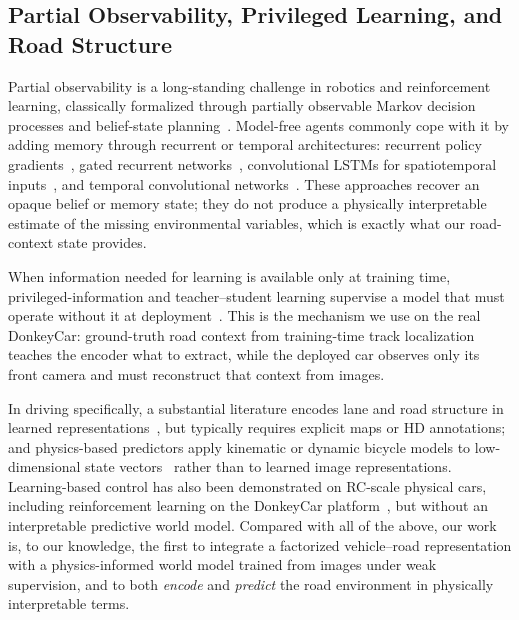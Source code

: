 \documentclass[preprint,12pt]{elsarticle}
\begin{document}
\subsection{Partial Observability, Privileged Learning, and Road Structure}\label{sec:rw_po}

Partial observability is a long-standing challenge in robotics and reinforcement
learning, classically formalized through partially observable Markov decision
processes and belief-state planning~\cite{kaelbling1998planning,
kaelbling1996reinforcement}.
Model-free agents commonly cope with it by adding memory through recurrent or
temporal architectures: recurrent policy gradients~\cite{wierstra2007solving},
gated recurrent networks~\cite{chung2014empirical}, convolutional LSTMs for
spatiotemporal inputs~\cite{shi2015convolutional}, and temporal convolutional
networks~\cite{bai2018empirical}.
These approaches recover an opaque belief or memory state; they do not produce a
physically interpretable estimate of the missing environmental variables, which is
exactly what our road-context state provides.

When information needed for learning is available only at training time,
privileged-information and teacher--student learning supervise a model that must
operate without it at deployment~\cite{chen2020learning, gou2021knowledge}.
This is the mechanism we use on the real DonkeyCar: ground-truth road context from
training-time track localization teaches the encoder what to extract, while the
deployed car observes only its front camera and must reconstruct that context from
images.

In driving specifically, a substantial literature encodes lane and road structure
in learned representations~\cite{salzmann2020trajectron++, itkina2023interpretable},
but typically requires explicit maps or HD annotations; and physics-based
predictors apply kinematic or dynamic bicycle models to low-dimensional state
vectors~\cite{kong2015kinematic} rather than to learned image representations.
Learning-based control has also been demonstrated on RC-scale physical cars,
including reinforcement learning on the DonkeyCar
platform~\cite{viitala2021learning}, but without an
interpretable predictive world model.
Compared with all of the above, our work is, to our knowledge, the first to
integrate a factorized vehicle--road representation with a physics-informed world
model trained from images under weak supervision, and to both \emph{encode} and
\emph{predict} the road environment in physically interpretable terms.
\end{document}
